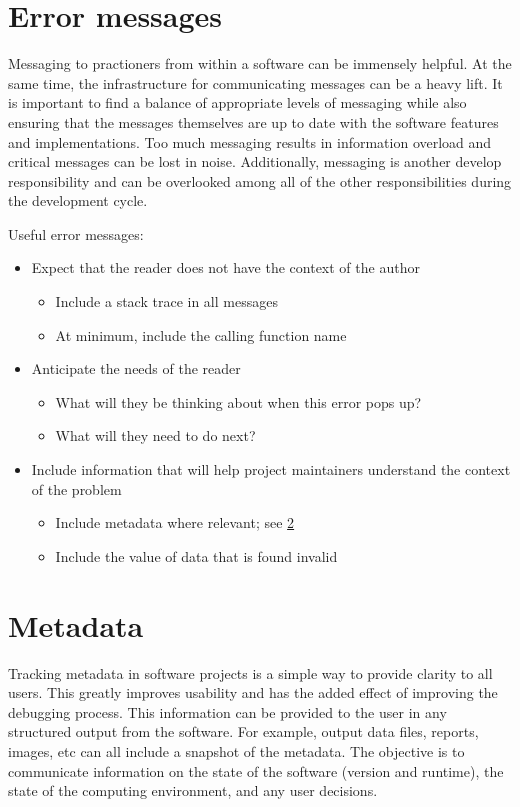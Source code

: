 \documentclass[]{nrel}
\begin{document}
\section{Error messages}
Messaging to practioners from within a software can be immensely helpful.
At the same time, the infrastructure for communicating messages can be a heavy lift.
It is important to find a balance of appropriate levels of messaging while also ensuring that
the messages themselves are up to date with the software features and implementations.
Too much messaging results in information overload and critical messages can be lost in noise.
Additionally, messaging is another develop responsibility and can be overlooked among all of the
other responsibilities during the development cycle.

Useful error messages:
\begin{itemize}
\item Expect that the reader does not have the context of the author
\begin{itemize}
\item Include a stack trace in all messages

\item At minimum, include the calling function name

\end{itemize}

\item Anticipate the needs of the reader
\begin{itemize}
\item What will they be thinking about when this error pops up?

\item What will they need to do next?

\end{itemize}

\item Include information that will help project maintainers understand the context of the problem
\begin{itemize}
\item Include metadata where relevant; see \ref{sec:metadata}

\item Include the value of data that is found invalid

\end{itemize}

\end{itemize}


\section{Metadata}
\label{sec:metadata}
Tracking metadata in software projects is a simple way to provide clarity to all users.
This greatly improves usability and has the added effect of improving the debugging process.
This information can be provided to the user in any structured output from the software.
For example, output data files, reports, images, etc can all include a snapshot of the metadata.
The objective is to communicate information on the state of the software (version and runtime),
the state of the computing environment, and any user decisions.
\end{document}
